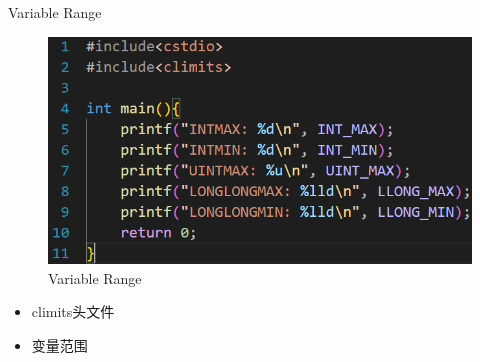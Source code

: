 \documentclass{beamer}
\begin{document}
\begin{frame}{Variable Range}
    \begin{minipage}{0.45\linewidth}
        \begin{figure}
        \centering
        \includegraphics[width=\linewidth]{pic/Variable Range.png}
        \caption{Variable Range}
        \label{fig:variablerange}
    \end{figure}
    \end{minipage}
    \hspace{1cm}
    \begin{minipage}{0.37\linewidth}
        \begin{itemize}
            \item climits头文件
            \item 变量范围
        \end{itemize}
    \end{minipage}
\end{frame}
\end{document}
